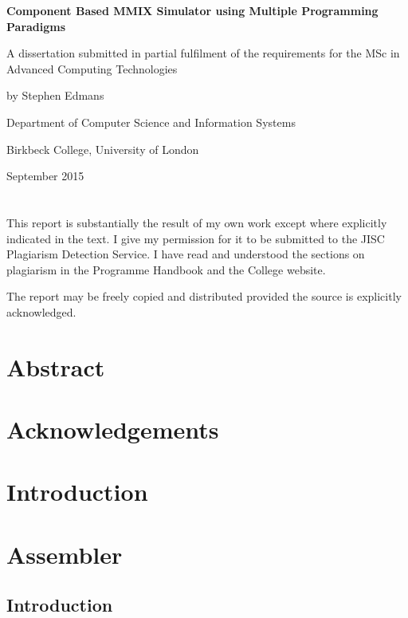 \documentclass[a4paper,11pt]{report}
\begin{document}
\begin{titlepage}
	\centering
	{\bfseries Component Based MMIX Simulator using Multiple Programming Paradigms \par}
	\vspace{1cm}
	{A dissertation submitted in partial fulfilment of the requirements for the MSc in Advanced Computing Technologies\par}
	\vspace{1.5cm}
	{by Stephen Edmans\par}
	\vspace{2cm}
	{Department of Computer Science and Information Systems\par}
	{Birkbeck College, University of London\par}
	\vspace{2cm}
	{\large September 2015\par}
\end{titlepage}
\newpage
\chapter*{} %
{This report is substantially the result of my own work except where explicitly
indicated in the text. I give my permission for it to be submitted to the JISC
Plagiarism Detection Service. I have read and understood the sections on plagiarism
in the Programme Handbook and the College website.\par}
\vspace{1cm}
{\noindent The report may be freely copied and distributed provided the source is explicitly
acknowledged.}
\chapter*{Abstract}
\newpage
{}
\tableofcontents
\newpage
\listoffigures
\newpage
\chapter*{Acknowledgements}
\chapter{Introduction}
\chapter{Assembler}
\section{Introduction}
\end{document}
